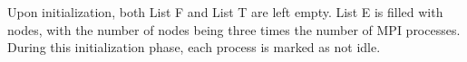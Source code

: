 Upon initialization, both List F and List T are left empty. List E is filled with nodes, with the number of nodes being three times the number of MPI processes. During this initialization phase, each process is marked as not idle.



